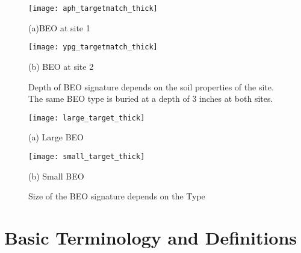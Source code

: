\documentclass[12pt,dvips]{report}
\numberwithin{equation}{section}
\begin{document}
\begin{figure}[htb]
\begin{minipage}[b]{.48\linewidth}
  \centering
  \centerline{\texttt{[image: aph\_targetmatch\_thick]}}
  \centerline{(a)BEO at site 1}
\end{minipage}
\begin{minipage}[b]{0.48\linewidth}
  \centering
  \centerline{\texttt{[image: ypg\_targetmatch\_thick]}}
  \centerline{(b) BEO at site 2}
\end{minipage}
%
\caption{Depth of BEO signature depends on the soil properties of the site. The same BEO type is buried at a depth of 3 inches at both sites.}
\label{fig:TargetvsSite}
\end{figure}

\begin{figure}[htb]
\begin{minipage}[b]{.48\linewidth}
  \centering
  \centerline{\texttt{[image: large\_target\_thick]}}
  \centerline{(a) Large BEO }
\end{minipage}
\begin{minipage}[b]{0.48\linewidth}
  \centering
  \centerline{\texttt{[image: small\_target\_thick]}}
  \centerline{(b) Small BEO }
\end{minipage}
%
\caption{Size of the BEO signature depends on the Type}
\label{fig:TargetvsType}
\end{figure}

\section{Basic Terminology and Definitions}
\end{document}
